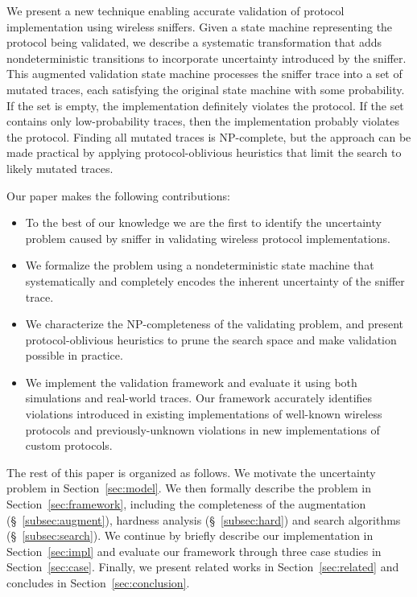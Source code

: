 We present a new technique enabling accurate validation of protocol
implementation using wireless sniffers.
%
Given a state machine representing the protocol being validated, we describe a
systematic transformation that adds nondeterministic transitions to
incorporate uncertainty introduced by the sniffer.
%
This augmented validation state machine processes the sniffer trace into a set
of mutated traces, each satisfying the original state machine with some
probability.
%
If the set is empty, the implementation definitely violates the protocol.
%
If the set contains only low-probability traces, then the implementation
probably violates the protocol.
%
Finding all mutated traces is NP-complete, but the approach can be made
practical by applying protocol-oblivious heuristics that limit the search to
likely mutated traces.

Our paper makes the following contributions:
%
\begin{itemize}
  \item To the best of our knowledge we are the first to identify the
    uncertainty problem caused by sniffer in validating wireless protocol
    implementations.
  \item We formalize the problem using a nondeterministic state machine that
    systematically and completely encodes the inherent uncertainty of the
    sniffer trace.
    \item We characterize the NP-completeness of the validating problem, and
      present protocol-oblivious heuristics to prune the search
      space and make validation possible in practice.
	\item We implement the validation framework and evaluate it using both
		\ns{} simulations and real-world traces.
		Our framework accurately identifies violations introduced in existing
		implementations of well-known wireless protocols and previously-unknown
		violations in new implementations of custom protocols.
\end{itemize}

The rest of this paper is organized as follows.
%
We motivate the uncertainty problem in Section~\ref{sec:model}.
%
We then formally describe the problem in Section~\ref{sec:framework},
including the completeness of the augmentation (\S~\ref{subsec:augment}),
hardness analysis (\S~\ref{subsec:hard}) and search algorithms
(\S~\ref{subsec:search}).
%
We continue by briefly describe our implementation in Section~\ref{sec:impl} and
evaluate our framework through three case studies in Section~\ref{sec:case}.
Finally, we present related works in Section~\ref{sec:related} and concludes in
Section~\ref{sec:conclusion}.
